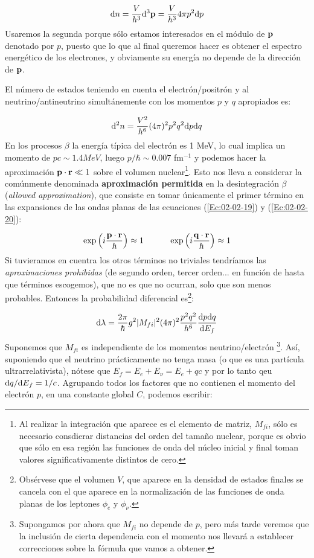 \begin{eqnarray}
	\mathrm{d} n = \frac{V}{h^3} \mathrm{d}^3 \mathbf{p} = \frac{V}{h^3} 4 \pi p^2 \mathrm{d} p
\end{eqnarray}
Usaremos la segunda porque sólo estamos interesados en el módulo de $\mathbf{p}$ denotado por $p$, puesto que lo que al final queremos hacer es obtener el espectro energético de los electrones, y obviamente su energía no depende de la dirección de $\mathbf{p}$. 

El número de estados teniendo en cuenta el electrón/positrón y al neutrino/antineutrino simultánemente con los momentos $p$ y $q$ apropiados es:

\begin{eqnarray}
	\mathrm{d}^2 n = \frac{V^2}{h^6} (4\pi)^2 p^2 q^2 \mathrm{d} p \mathrm{d} q
\end{eqnarray}
En los procesos $\beta$ la energía típica del electrón es 1 MeV, lo cual implica un momento de $pc\sim1.4 MeV$, luego $p/\hbar \sim 0.007$ fm$^{-1}$ y podemos hacer la aproximación $\mathbf{p}\cdot\mathbf{r}\ll 1$ sobre el volumen nuclear\footnote{Al realizar la integración que aparece es el elemento de matriz, $M_{fi}$, sólo es necesario consdierar distancias del orden del tamaño nuclear, porque es obvio que sólo en esa región las funciones de onda del núcleo inicial y final toman valores significativamente distintos de cero.}. Esto nos lleva a considerar la comúnmente denominada \textbf{aproximación permitida} en la desintegración $\beta$ (\textit{allowed approximation}), que consiste en tomar únicamente el primer término en las expansiones de las ondas planas de las ecuaciones (\ref{Ec:02-02-19}) y (\ref{Ec:02-02-20}):

\begin{eqnarray}
	\exp \left( i \frac{\mathbf{p} \cdot \mathbf{r}}{\hbar} \right) \approx 1 \quad \quad \quad \exp \left( i \frac{\mathbf{q} \cdot \mathbf{r}}{\hbar} \right) \approx 1
\end{eqnarray} 
Si tuvieramos en cuentra los otros términos no triviales tendríamos las \textit{aproximaciones prohibidas} (de segundo orden, tercer orden... en función de hasta que términos escogemos), que no es que no ocurran, solo que son menos probables. Entonces la probabilidad diferencial es\footnote{Obsérvese que el volumen $V$, que aparece en la densidad de estados finales se cancela con el que aparece en la normalización de las funciones de onda planas de los leptones $\phi_e$ y $\phi_\nu$.}:

\begin{eqnarray}
	\mathrm{d} \lambda = \frac{2\pi}{\hbar} g^2 |M_{fi}|^2 (4\pi)^2 \frac{p^2 q^2}{h^ 6} \frac{\mathrm{d} p \mathrm{d} q }{\mathrm{d} E_f} \label{Ec:02-02-24}
\end{eqnarray}
Suponemos que $M_{fi}$ es independiente de los momentos neutrino/electrón \footnote{Supongamos por ahora que $M_{fi}$ no depende de $p$, pero más tarde veremos que la inclusión de cierta dependencia con el momento nos llevará a establecer correcciones sobre la fórmula que vamos a obtener.}. Así, suponiendo que el neutrino prácticamente no tenga masa (o que es una partícula ultrarrelativista), nótese que $E_f=E_e+E_\nu=E_e+qc$ y por lo tanto qeu $\mathrm{d} q / \mathrm{d} E_f=1/c$. Agrupando todos los factores que no contienen el momento del electrón $p$, en una constante global $C$, podemos escribir:

